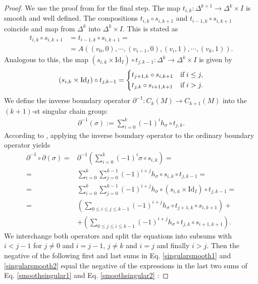 \documentclass[envcountsect,runningheads]{llncs}
\begin{document}
\begin{proof}
We use the proof from \cite[Theo.~2.4]{parkproof} for the final step. The map $t_{i,k}: \Delta^{k+1} \rightarrow \Delta^k \times I$ is smooth and well defined. The compositions $t_{i,k} \circ s_{i,k+1}$ and $t_{i-1,k} \circ s_{i,k+1}$ coincide and map from $\Delta^k$ into $\Delta^k \times I$. This is stated as
\begin{align}
\label{interchange}
	t_{i,k} \circ s_{i,k+1} &= t_{i-1,k} \circ s_{i,k+1} = \\
	&= A\left(\left( v_0,0 \right), \cdots, (v_{i-1},0), (v_i,1),\cdots,(v_k,1)\right).
\end{align}
Analogous to this, the map $(s_{i,k} \times \text{Id}_{I}) \circ t_{j,k-1}: \Delta^{k} \rightarrow \Delta^{k} \times I$ is given by
\begin{align}
(s_{i,k} \times \text{Id}_{I}) \circ t_{j,k-1} =
	\begin{dcases}
	    t_{j+1,k} \circ s_{i,k+1} & \text{if} \; i \leq j, \\
	    t_{j,k} \circ s_{i+1,k+1} & \text{if} \; i > j.
	\end{dcases}
\end{align}
We define the inverse boundary operator $\partial^{-1}: C_{k}(M) \rightarrow C_{k+1}(M)$ into the $(k+1)$-st singular chain group:
\begin{align}
	\partial^{-1}(\sigma) := \sum_{i=0}^{k} (-1)^{i} h_\sigma \circ t_{j,k}.
\end{align}
According to \cite[Lem.~2.3]{parkproof}, applying the inverse boundary operator to the ordinary boundary operator yields
\begin{align}
	\partial^{-1} \circ \partial(\sigma) = & \partial^{-1}\left( \sum_{i=0}^{k} (-1)^i \sigma \circ s_{i,k} \right) =\\
	= &\sum_{i=0}^{k} \sum_{j=0}^{k-1} (-1)^{i+j} h_\sigma \circ s_{i,k} \circ t_{j,k-1} = \\
	= &\sum_{i=0}^{k}\sum_{j=0}^{k-1} (-1)^{i+j} h_\sigma \circ \left( s_{i,k} \times \text{Id}_I \right) \circ t_{j,k-1}=\\
	\label{smoothsingular1}
	= &\left( \sum_{0 \leq i \leq j \leq k-1} (-1)^{i+j} h_\sigma \circ t_{j+1,k} \circ s_{i,k+1} \right) + \\
	\label{smoothsingular2}
	  &+ \left( \sum_{0 \leq j \leq i \leq k-1} (-1)^{i+j} h_\sigma \circ t_{j,k} \circ s_{i+1,k+1} \right).
\end{align}
We interchange both operators and split the equations into subsums with $i < j-1$ for $j \neq 0$ and $i = j-1$, $j \neq k$ and $i = j$ and finally $i > j$. Then the negative of the following first and last sums in Eq. \ref{singularsmooth1} and \ref{singularsmooth2} equal the negative of the expressions in the last two sums of Eq. \ref{smoothsingular1} and Eq. \ref{smoothsingular2} \cite[Theo.~2.4]{parkproof}:

\end{proof}
\end{document}
